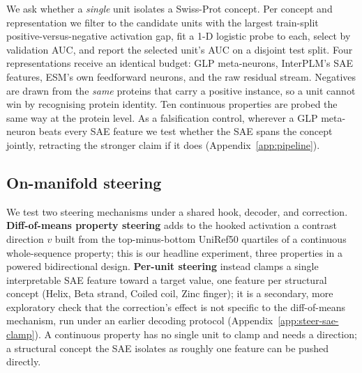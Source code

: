 \documentclass{article}
\begin{document}
We ask whether a \emph{single} unit isolates a Swiss-Prot concept. Per concept and
representation we filter to the candidate units with the largest train-split
positive-versus-negative activation gap, fit a 1-D logistic probe to each, select by
validation AUC, and report the selected unit's AUC on a disjoint test split. Four
representations receive an identical budget: GLP meta-neurons, InterPLM's SAE features, ESM's
own feedforward neurons, and the raw residual stream. Negatives are drawn from the
\emph{same} proteins that carry a positive instance, so a unit cannot win by recognising
protein identity. Ten continuous properties are probed the same way at the protein level.
As a falsification control, wherever a GLP meta-neuron beats every SAE feature we test whether
the SAE spans the concept jointly, retracting the stronger claim if it does
(Appendix~\ref{app:pipeline}).

\subsection{On-manifold steering}
\label{sec:method-steering}

We test two steering mechanisms under a shared hook, decoder, and correction.
\textbf{Diff-of-means property steering} \cite{huang2025diffmean} adds to the hooked
activation a contrast direction $v$ built from the top-minus-bottom UniRef50 quartiles of a
continuous whole-sequence property; this is our headline experiment, three properties in a
powered bidirectional design. \textbf{Per-unit steering} \cite{villegas2025plmsae} instead
clamps a single interpretable SAE feature toward a target value, one feature per structural
concept (Helix, Beta strand, Coiled coil, Zinc finger); it is a secondary, more exploratory
check that the correction's effect is not specific to the diff-of-means mechanism, run under an
earlier decoding protocol (Appendix~\ref{app:steer-sae-clamp}). A continuous property has no
single unit to clamp and needs a direction; a structural concept the SAE isolates as roughly one
feature can be pushed directly.
\end{document}
